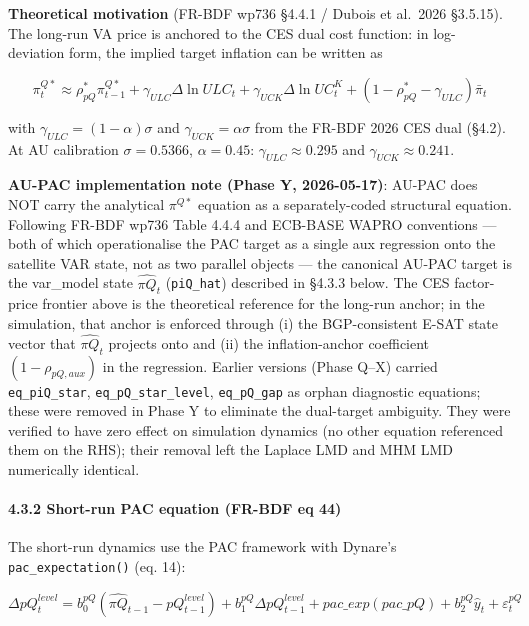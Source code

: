 \documentclass[
]{article}
\begin{document}
\textbf{Theoretical motivation} (FR-BDF wp736 §4.4.1 / Dubois et
al.~2026 §3.5.15). The long-run VA price is anchored to the CES dual
cost function: in log-deviation form, the implied target inflation can
be written as

\[\pi^{Q*}_t \approx \rho^*_{pQ} \pi^{Q*}_{t-1} + \gamma_{ULC} \Delta \ln ULC_t + \gamma_{UCK} \Delta \ln UC^K_t + (1 - \rho^*_{pQ} - \gamma_{ULC}) \bar{\pi}_t\]

with \(\gamma_{ULC} = (1-\alpha)\sigma\) and
\(\gamma_{UCK} = \alpha\sigma\) from the FR-BDF 2026 CES dual (§4.2). At
AU calibration \(\sigma=0.5366\), \(\alpha=0.45\):
\(\gamma_{ULC} \approx 0.295\) and \(\gamma_{UCK} \approx 0.241\).

\textbf{AU-PAC implementation note (Phase Y, 2026-05-17)}: AU-PAC does
NOT carry the analytical \(\pi^{Q*}\) equation as a separately-coded
structural equation. Following FR-BDF wp736 Table 4.4.4 and ECB-BASE
WAPRO conventions --- both of which operationalise the PAC target as a
single aux regression onto the satellite VAR state, not as two parallel
objects --- the canonical AU-PAC target is the var\_model state
\(\widehat{\pi Q}_t\) (\texttt{piQ\_hat}) described in §4.3.3 below. The
CES factor-price frontier above is the theoretical reference for the
long-run anchor; in the simulation, that anchor is enforced through (i)
the BGP-consistent E-SAT state vector that \(\widehat{\pi Q}_t\)
projects onto and (ii) the inflation-anchor coefficient
\((1-\rho_{pQ,aux})\) in the regression. Earlier versions (Phase Q--X)
carried \texttt{eq\_piQ\_star}, \texttt{eq\_pQ\_star\_level},
\texttt{eq\_pQ\_gap} as orphan diagnostic equations; these were removed
in Phase Y to eliminate the dual-target ambiguity. They were verified to
have zero effect on simulation dynamics (no other equation referenced
them on the RHS); their removal left the Laplace LMD and MHM LMD
numerically identical.

\paragraph{4.3.2 Short-run PAC equation (FR-BDF eq
44)}\label{short-run-pac-equation-fr-bdf-eq-44}

The short-run dynamics use the PAC framework with Dynare's
\texttt{pac\_expectation()} (eq. 14):

\[\Delta pQ^{level}_t = b^{pQ}_0 (\widehat{\pi Q}_{t-1} - pQ^{level}_{t-1}) + b^{pQ}_1 \Delta pQ^{level}_{t-1} + pac\_exp(pac\_pQ) + b^{pQ}_2 \hat{y}_t + \varepsilon^{pQ}_t\]
\end{document}
